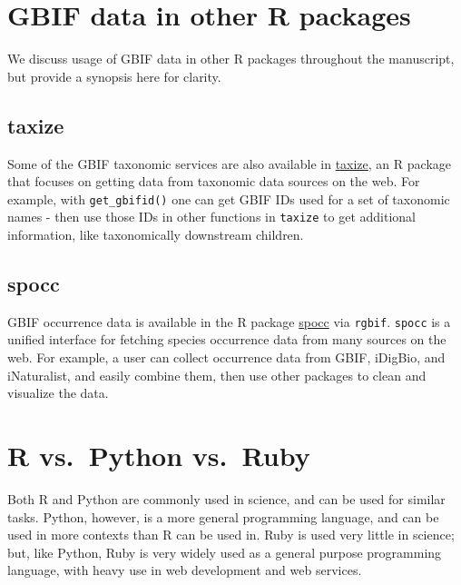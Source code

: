 \documentclass[3p]{elsarticle} %
\begin{document}
\hypertarget{gbif-data-in-other-r-packages}{%
\section{GBIF data in other R
packages}\label{gbif-data-in-other-r-packages}}

We discuss usage of GBIF data in other R packages throughout the
manuscript, but provide a synopsis here for clarity.

\hypertarget{taxize}{%
\subsection{taxize}\label{taxize}}

Some of the GBIF taxonomic services are also available in
\href{https://github.com/ropensci/taxize}{taxize}, an R package that
focuses on getting data from taxonomic data sources on the web. For
example, with \texttt{get\_gbifid()} one can get GBIF IDs used for a set
of taxonomic names - then use those IDs in other functions in
\texttt{taxize} to get additional information, like taxonomically
downstream children.

\hypertarget{spocc}{%
\subsection{spocc}\label{spocc}}

GBIF occurrence data is available in the R package
\href{https://github.com/ropensci/spocc}{spocc} via \texttt{rgbif}.
\texttt{spocc} is a unified interface for fetching species occurrence
data from many sources on the web. For example, a user can collect
occurrence data from GBIF, iDigBio, and iNaturalist, and easily combine
them, then use other packages to clean and visualize the data.

\hypertarget{r-vs.-python-vs.-ruby}{%
\section{R vs.~Python vs.~Ruby}\label{r-vs.-python-vs.-ruby}}

Both R and Python are commonly used in science, and can be used for
similar tasks. Python, however, is a more general programming language,
and can be used in more contexts than R can be used in. Ruby is used
very little in science; but, like Python, Ruby is very widely used as a
general purpose programming language, with heavy use in web development
and web services.
\end{document}
